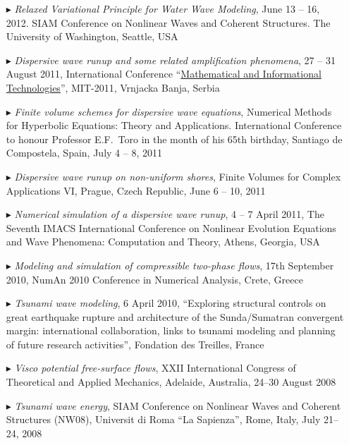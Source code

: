 \begin{itemize}
  \item[$\blacktriangleright$] \textit{Relaxed Variational Principle for Water Wave Modeling}, June 13 -- 16, 2012. SIAM Conference on Nonlinear Waves and Coherent Structures. The University of Washington, Seattle, USA

  \item[$\blacktriangleright$] \textit{Dispersive wave runup and some related amplification phenomena}, 27 -- 31 August 2011, International Conference ``\href{http://mit.rs/2011/index.html}{Mathematical and Informational Technologies}'', MIT-2011, Vrnjacka Banja, Serbia
  
  \item[$\blacktriangleright$] \textit{Finite volume schemes for dispersive wave equations}, Numerical Methods for Hyperbolic Equations: Theory and Applications. International Conference to honour Professor E.F.~Toro in the month of his 65th birthday, Santiago de Compostela, Spain, July 4 -- 8, 2011
  
  \item[$\blacktriangleright$] \textit{Dispersive wave runup on non-uniform shores}, Finite Volumes for Complex Applications VI, Prague, Czech Republic, June 6 -- 10, 2011
  
  \item[$\blacktriangleright$] \textit{Numerical simulation of a dispersive wave runup}, 4 -- 7 April 2011, The Seventh IMACS International Conference on Nonlinear Evolution Equations and Wave Phenomena: Computation and Theory, Athens, Georgia, USA
  
  \item[$\blacktriangleright$] \textit{Modeling and simulation of compressible two-phase flows}, 17th September 2010, NumAn 2010 Conference in Numerical Analysis, Crete, Greece
  
  \item[$\blacktriangleright$] \textit{Tsunami wave modeling}, 6 April 2010, ``Exploring structural controls on great earthquake rupture and architecture of the Sunda/Sumatran convergent margin: international collaboration, links to tsunami modeling and planning of future research activities'', Fondation des Treilles, France
  
  \item[$\blacktriangleright$] \textit{Visco potential free-surface flows}, XXII International Congress of Theoretical and Applied Mechanics, Adelaide, Australia, 24--30 August 2008
  
  \item[$\blacktriangleright$] \textit{Tsunami wave energy}, SIAM Conference on Nonlinear Waves and Coherent Structures (NW08), Universit di Roma ``La Sapienza'', Rome, Italy, July 21--24, 2008
  

\end{itemize}
